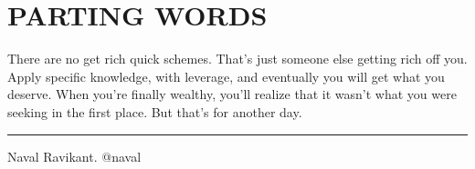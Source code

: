 \documentclass[a4paper,10pt]{article}
\begin{document}
\section{PARTING WORDS}
There are no get rich quick schemes. That's just someone else getting rich off you. Apply specific knowledge, with leverage, and eventually you will get what you deserve. When you're finally wealthy, you'll realize that it wasn't what you were seeking in the first place. But that's for another day.

\noindent\rule{\textwidth}{0.4pt}

\begin{flushleft}
Naval Ravikant. @naval
\end{flushleft}
\end{document}
